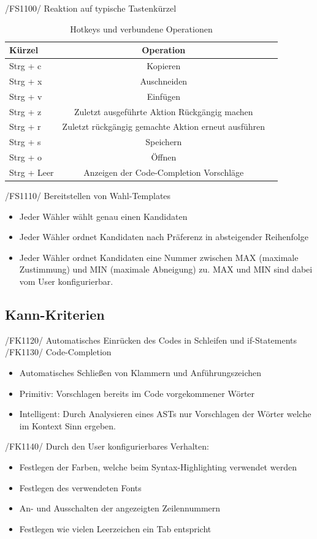 \documentclass[a4paper]{scrreprt}
\begin{document}
/FS1100/ Reaktion auf typische Tastenkürzel\\
\begin{table}[H]
\caption{Hotkeys und verbundene Operationen}
\begin{tabular}{lcr} 
Kürzel & Operation \\
\hline 
Strg + c & Kopieren \\
Strg + x & Auschneiden \\
Strg + v & Einfügen \\
Strg + z & Zuletzt ausgeführte Aktion Rückgängig machen \\
Strg + r & Zuletzt rückgängig gemachte Aktion erneut ausführen \\
Strg + s & Speichern \\
Strg + o & Öffnen \\
Strg + Leer & Anzeigen der Code-Completion Vorschläge\\
\end{tabular}
\label{table:Hotkeys_and_operations}
\end{table}

/FS1110/ Bereitstellen von Wahl-Templates
\begin{itemize}
\item Jeder Wähler wählt genau einen Kandidaten
\item Jeder Wähler ordnet Kandidaten nach Präferenz in absteigender Reihenfolge 
\item Jeder Wähler ordnet Kandidaten eine Nummer zwischen MAX (maximale Zustimmung) und MIN (maximale Abneigung) zu. MAX und MIN sind dabei vom User konfigurierbar. 
\end{itemize}

\subsection{Kann-Kriterien}
/FK1120/ Automatisches Einrücken des Codes in Schleifen und if-Statements \\
/FK1130/ Code-Completion
\begin{itemize}
\item Automatisches Schließen von Klammern und Anführungszeichen
\item Primitiv: Vorschlagen bereits im Code vorgekommener Wörter
\item Intelligent: Durch Analysieren eines ASTs nur Vorschlagen der Wörter welche im Kontext Sinn ergeben.
\end{itemize}

/FK1140/ Durch den User konfigurierbares Verhalten:
\begin{itemize}
\item Festlegen der Farben, welche beim Syntax-Highlighting verwendet werden
\item Festlegen des verwendeten Fonts
\item An- und Ausschalten der angezeigten Zeilennummern
\item Festlegen wie vielen Leerzeichen ein Tab entspricht
\end{itemize}
 
\end{document}
